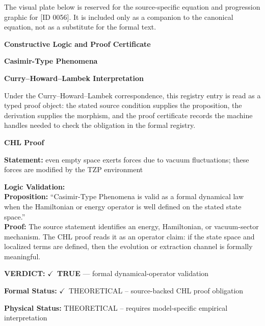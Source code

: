 \begingroup\footnotesize\sloppy
The visual plate below is reserved for the source-specific equation and progression graphic for [ID 0056]. It is included only as a companion to the canonical equation, not as a substitute for the formal text.
\par\endgroup
\ifTZPDarkEdition
{}
\fi

\clearpage
\begingroup\tzpsupportsetup
\noindent\textbf{\fontsize{10.8pt}{12.8pt}\selectfont [ID 0056] Constructive Logic and Proof Certificate}\par
\noindent\textbf{\fontsize{10pt}{12pt}\selectfont Casimir-Type Phenomena}\par
\vspace{0.45em}
\begingroup
\footnotesize
\setlength{\parskip}{0.22em}
\setlength{\parindent}{0pt}
\noindent\textbf{Curry--Howard--Lambek Interpretation}\par
Under the Curry--Howard--Lambek correspondence, this registry entry is read as a typed proof
object: the stated source condition supplies the proposition, the derivation supplies the
morphism, and the proof certificate records the machine handles needed to check the obligation
in the formal registry.

\vspace{0.45em}
\noindent\textbf{CHL Proof}\par
\textbf{Statement:} even empty space exerts forces due to vacuum fluctuations; these forces are modified by
the TZP environment

\textbf{Logic Validation:}\\
\textbf{Proposition:} ``Casimir-Type Phenomena is valid as a formal dynamical law when the Hamiltonian or energy
operator is well defined on the stated state space.''\\
\textbf{Proof:} The source statement identifies an energy, Hamiltonian, or vacuum-sector mechanism. The
CHL proof reads it as an operator claim: if the state space and localized terms are
defined, then the evolution or extraction channel is formally meaningful.

\textbf{VERDICT:} \ensuremath{\checkmark}\ \textbf{TRUE} --- formal dynamical-operator validation

\textbf{Formal Status:} \ensuremath{\checkmark}\ THEORETICAL -- source-backed CHL proof obligation

\textbf{Physical Status:} THEORETICAL -- requires model-specific empirical interpretation
\par\vspace{0.45em}
\par
\ifTZPDarkEdition
{}
\fi
\endgroup
\endgroup
